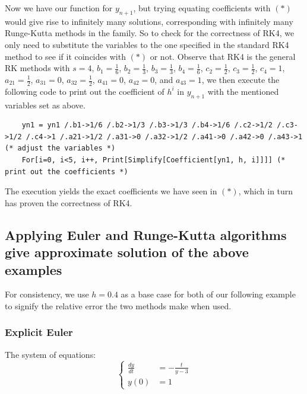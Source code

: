 \documentclass[a4paper]{article}
\numberwithin{equation}{section}
\begin{document}
Now we have our function for \(y_{n+1}\), but trying equating coefficients with \((*)\) would give rise to infinitely many solutions, corresponding with infinitely many Runge-Kutta methods in the family. So to check for the correctness of RK4, we only need to substitute the variables to the one specified in the standard RK4 method to see if it coincides with \((*)\) or not. Observe that RK4 is the general RK methods with \(s = 4\), \(b_1 = \frac{1}{6}\), \(b_2 = \frac{1}{3}\), \(b_3 = \frac{1}{3}\), \(b_4 = \frac{1}{6}\), \(c_2 = \frac{1}{2}\), \(c_3 = \frac{1}{2}\), \(c_4 = 1\), \(a_{21} = \frac{1}{2}\), \(a_{31} = 0\), \(a_{32} = \frac{1}{2}\), \(a_{41} = 0\), \(a_{42} = 0\), and \(a_{43} = 1\), we then execute the following code to print out the coefficient of \(h^i\) in \(y_{n+1}\) with the mentioned variables set as above.
\begin{mdframed}[leftline=false,rightline=false,backgroundcolor=magenta!10,nobreak=true]
  \begin{verbatim}
    yn1 = yn1 /.b1->1/6 /.b2->1/3 /.b3->1/3 /.b4->1/6 /.c2->1/2 /.c3->1/2 /.c4->1 /.a21->1/2 /.a31->0 /.a32->1/2 /.a41->0 /.a42->0 /.a43->1 (* adjust the variables *)
    For[i=0, i<5, i++, Print[Simplify[Coefficient[yn1, h, i]]]] (* print out the coefficients *)
  \end{verbatim}
\end{mdframed}

The execution yields the exact coefficients we have seen in \((*)\), which in turn has proven the correctness of RK4.

\subsection{Applying Euler and Runge-Kutta algorithms give approximate solution of the above examples}
For consistency, we use \(h = 0.4\) as a base case for both of our following example to signify the relative error the two methods make when used.

\subsubsection{Explicit Euler}
The system of equations:
\begin{equation*}
  \begin{cases}
    \frac{dy}{dt} & = - \frac{t}{y - 3} \\
    y(0)          & = 1
  \end{cases}
\end{equation*}
\end{document}
